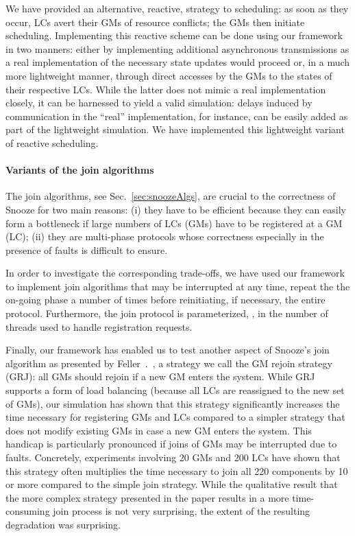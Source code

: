 We have provided an alternative, reactive, strategy to scheduling: as
soon as they occur, LCs avert their GMs of resource conflicts; the GMs
then initiate scheduling. Implementing this reactive scheme can be
done using our framework in two manners: either by implementing
additional asynchronous transmissions as a real implementation of the
necessary state updates would proceed or, in a much more lightweight
manner, through direct accesses by the GMs to the states of their
respective LCs. While the latter does not mimic a real implementation
closely, it can be harnessed to yield a valid simulation: delays
induced by communication in the ``real'' implementation, for instance,
can be easily added as part of the lightweight simulation. We have
implemented this lightweight variant of reactive scheduling.


\paragraph{Variants of the join algorithms}

The join algorithms, see Sec.~\ref{sec:snoozeAlgs}, are crucial to the
correctness of Snooze for two main reasons: (i) they have to be
efficient because they can easily form a bottleneck if large numbers
of LCs (GMs) have to be registered at a GM (LC); (ii) they are
multi-phase protocols whose correctness especially in the presence of
faults is difficult to ensure.

In order to investigate the corresponding trade-offs, we have used our
framework to implement join algorithms that may be interrupted at any
time, repeat the the on-going phase a number of times before
reinitiating, if necessary, the entire protocol. Furthermore, the join
protocol is parameterized, \eg, in the number of threads used to
handle registration requests.

Finally, our framework has enabled us to test another aspect of
Snooze's join algorithm as presented by
Feller~\etal.~\cite{feller:ccgrid12}, a strategy we call the GM rejoin
strategy (GRJ): all GMs should rejoin if a new GM enters the
system. While GRJ supports a form of load balancing (because all LCs
are reassigned to the new set of GMs), our simulation has shown that
this strategy significantly increases the time necessary for
registering GMs and LCs compared to a simpler strategy that does not
modify existing GMs in case a new GM enters the system. This handicap
is particularly pronounced if joins of GMs may be interrupted due to
faults. Concretely, experiments involving 20 GMs and 200 LCs have
shown that this strategy often multiplies the time necessary to join
all 220 components by 10 or more compared to the simple join
strategy. While the qualitative result that the more complex strategy
presented in the paper results in a more time-consuming join process
is not very surprising, the extent of the resulting degradation was
surprising.



